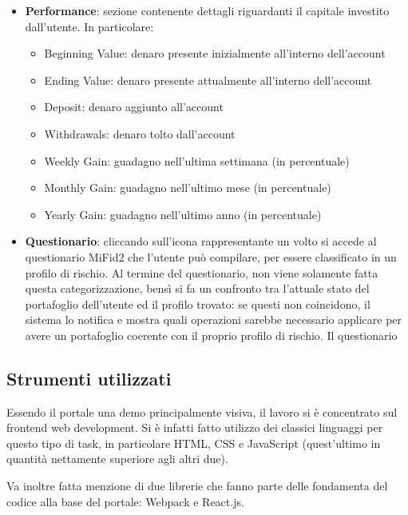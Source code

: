 \begin{itemize}
    \item \textbf{Performance}: sezione contenente dettagli riguardanti il capitale investito dall'utente. In particolare:

    \begin{itemize}
        \item Beginning Value: denaro presente inizialmente all'interno dell'account
        \item Ending Value: denaro presente attualmente all'interno dell'account
        \item Deposit: denaro aggiunto all'account
        \item Withdrawals: denaro tolto dall'account
        \item Weekly Gain: guadagno nell'ultima settimana (in percentuale)
        \item Monthly Gain: guadagno nell'ultimo mese (in percentuale)
        \item Yearly Gain: guadagno nell'ultimo anno (in percentuale)
    \end{itemize}

    \item \textbf{Questionario}: cliccando sull'icona rappresentante un volto si accede al questionario MiFid2  che l'utente può compilare, per essere classificato in un profilo di rischio.  Al termine del questionario, non viene solamente fatta questa categorizzazione, bensì si fa un confronto tra l'attuale stato del portafoglio dell'utente ed il profilo trovato: se questi non coincidono, il sistema lo notifica e mostra quali operazioni sarebbe necessario applicare per avere un portafoglio coerente con il proprio profilo di rischio. Il questionario 

\end{itemize}

\subsection{Strumenti utilizzati}
Essendo il portale una demo principalmente visiva, il lavoro si è concentrato sul frontend web development. Si è infatti fatto utilizzo dei classici linguaggi per questo tipo di task, in particolare HTML, CSS e JavaScript (quest'ultimo in quantità nettamente superiore agli altri due).

Va inoltre fatta menzione di due librerie che fanno parte delle fondamenta del codice alla base del portale: Webpack e React.js.

